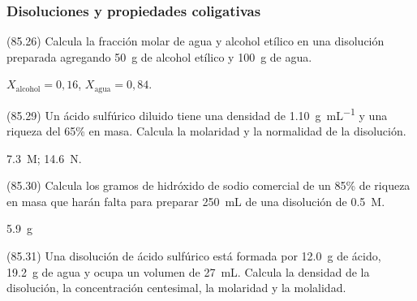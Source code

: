 \documentclass[10pt,a5paper,twoside]{article}
\begin{document}
  \subsubsection*{Disoluciones y propiedades coligativas}
  \begin{exercise}[
      tags    = {},
      topics  = {química,química básica},
      source  = {FQ 1B MGH 2016, p85, e26},
    ]
    (85.26) Calcula la fracción molar de agua y alcohol etílico en una
    disolución preparada agregando \SI{50}{\gram} de alcohol etílico y \SI{100}{\gram} de agua.
  \end{exercise}

  \begin{solution}
    \( X_\textrm{alcohol} = 0,16 \), \( X_\textrm{agua} = 0,84 \).
  \end{solution}




  \begin{exercise}[
      tags    = {},
      topics  = {química,química básica},
      source  = {FQ 1B MGH 2016, p85, e29},
    ]
    (85.29) Un ácido sulfúrico diluido tiene una densidad de \SI{1.10}{\gram\per\milli\liter} y una riqueza del 65\% en masa. Calcula la molaridad y la normalidad de la disolución.
  \end{exercise}

  \begin{solution}
    \SI{7.3}{M}; \SI{14.6}{N}.
  \end{solution}




  \begin{exercise}[
      tags    = {},
      topics  = {química,química básica},
      source  = {FQ 1B MGH 2016, p85, e30},
    ]
    (85.30) Calcula los gramos de hidróxido de sodio comercial de un
    85\% de riqueza en masa que harán falta para preparar \SI{250}{\milli\liter} de una disolución de  \SI{0.5}{M}.
  \end{exercise}

  \begin{solution}
    \SI{5.9}{\gram}
  \end{solution}




  \begin{exercise}[
      tags    = {},
      topics  = {química,química básica},
      source  = {FQ 1B MGH 2016, p85, e31},
    ]
    (85.31) Una disolución de ácido sulfúrico está formada por \SI{12.0}{\gram} de
    ácido, \SI{19.2}{\gram} de agua y ocupa un volumen de \SI{27}{\milli\liter}. Calcula la densidad de la disolución, la concentración centesimal, la molaridad y la molalidad.
  \end{exercise}
\end{document}
